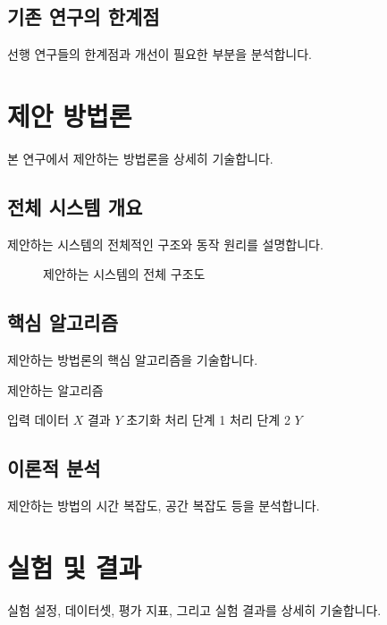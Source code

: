 \documentclass[12pt,a4paper]{article}
\begin{document}
\subsection{기존 연구의 한계점}
선행 연구들의 한계점과 개선이 필요한 부분을 분석합니다.

\section{제안 방법론}
\label{sec:methodology}

본 연구에서 제안하는 방법론을 상세히 기술합니다.

\subsection{전체 시스템 개요}
제안하는 시스템의 전체적인 구조와 동작 원리를 설명합니다.

\begin{figure}[htbp]
    \centering
    \caption{제안하는 시스템의 전체 구조도}
    \label{fig:system_overview}
\end{figure}

\subsection{핵심 알고리즘}
제안하는 방법론의 핵심 알고리즘을 기술합니다.

\begin{algorithm}
\caption{제안하는 알고리즘}
\label{alg:proposed}
\begin{algorithmic}[1]
\REQUIRE 입력 데이터 $X$
\ENSURE 결과 $Y$
\STATE 초기화
    \STATE 처리 단계 1
    \STATE 처리 단계 2
\ENDFOR
\RETURN $Y$
\end{algorithmic}
\end{algorithm}

\subsection{이론적 분석}
제안하는 방법의 시간 복잡도, 공간 복잡도 등을 분석합니다.

\section{실험 및 결과}
\label{sec:experiments}

실험 설정, 데이터셋, 평가 지표, 그리고 실험 결과를 상세히 기술합니다.
\end{document}
